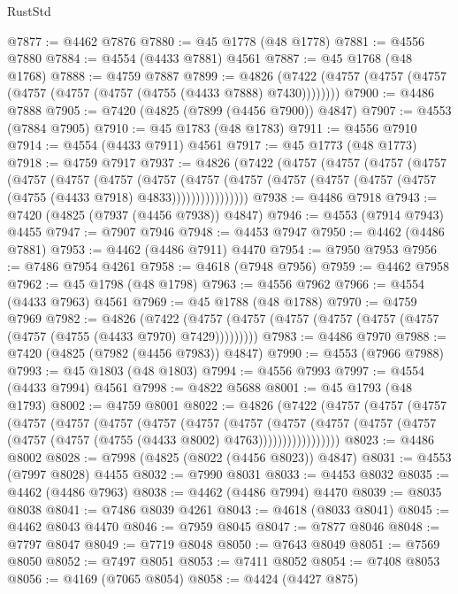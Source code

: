 \begin{lexlean}{RustStd}
\begin{coremodule}
@7877 := @4462 @7876
@7880 := @45 @1778 (@48 @1778)
@7881 := @4556 @7880
@7884 := @4554 (@4433 @7881) @4561
@7887 := @45 @1768 (@48 @1768)
@7888 := @4759 @7887
@7899 := @4826 (@7422 (@4757 (@4757 (@4757 (@4757 (@4757 (@4757 (@4755 (@4433 @7888) @7430))))))))
@7900 := @4486 @7888
@7905 := @7420 (@4825 (@7899 (@4456 @7900)) @4847)
@7907 := @4553 (@7884 @7905)
@7910 := @45 @1783 (@48 @1783)
@7911 := @4556 @7910
@7914 := @4554 (@4433 @7911) @4561
@7917 := @45 @1773 (@48 @1773)
@7918 := @4759 @7917
@7937 := @4826
    (@7422
      (@4757
        (@4757
          (@4757
            (@4757
              (@4757
                (@4757
                  (@4757
                    (@4757
                      (@4757
                        (@4757
                          (@4757 (@4757 (@4757 (@4757 (@4755 (@4433 @7918) @4833))))))))))))))))
@7938 := @4486 @7918
@7943 := @7420 (@4825 (@7937 (@4456 @7938)) @4847)
@7946 := @4553 (@7914 @7943) @4455
@7947 := @7907 @7946
@7948 := @4453 @7947
@7950 := @4462 (@4486 @7881)
@7953 := @4462 (@4486 @7911) @4470
@7954 := @7950 @7953
@7956 := @7486 @7954 @4261
@7958 := @4618 (@7948 @7956)
@7959 := @4462 @7958
@7962 := @45 @1798 (@48 @1798)
@7963 := @4556 @7962
@7966 := @4554 (@4433 @7963) @4561
@7969 := @45 @1788 (@48 @1788)
@7970 := @4759 @7969
@7982 := @4826
    (@7422 (@4757 (@4757 (@4757 (@4757 (@4757 (@4757 (@4757 (@4755 (@4433 @7970) @7429)))))))))
@7983 := @4486 @7970
@7988 := @7420 (@4825 (@7982 (@4456 @7983)) @4847)
@7990 := @4553 (@7966 @7988)
@7993 := @45 @1803 (@48 @1803)
@7994 := @4556 @7993
@7997 := @4554 (@4433 @7994) @4561
@7998 := @4822 @5688
@8001 := @45 @1793 (@48 @1793)
@8002 := @4759 @8001
@8022 := @4826
    (@7422
      (@4757
        (@4757
          (@4757
            (@4757
              (@4757
                (@4757
                  (@4757
                    (@4757
                      (@4757
                        (@4757
                          (@4757
                            (@4757 (@4757 (@4757 (@4757 (@4755 (@4433 @8002) @4763)))))))))))))))))
@8023 := @4486 @8002
@8028 := @7998 (@4825 (@8022 (@4456 @8023)) @4847)
@8031 := @4553 (@7997 @8028) @4455
@8032 := @7990 @8031
@8033 := @4453 @8032
@8035 := @4462 (@4486 @7963)
@8038 := @4462 (@4486 @7994) @4470
@8039 := @8035 @8038
@8041 := @7486 @8039 @4261
@8043 := @4618 (@8033 @8041)
@8045 := @4462 @8043 @4470
@8046 := @7959 @8045
@8047 := @7877 @8046
@8048 := @7797 @8047
@8049 := @7719 @8048
@8050 := @7643 @8049
@8051 := @7569 @8050
@8052 := @7497 @8051
@8053 := @7411 @8052
@8054 := @7408 @8053
@8056 := @4169 (@7065 @8054)
@8058 := @4424 (@4427 @875)

\end{coremodule}
\end{lexlean}
